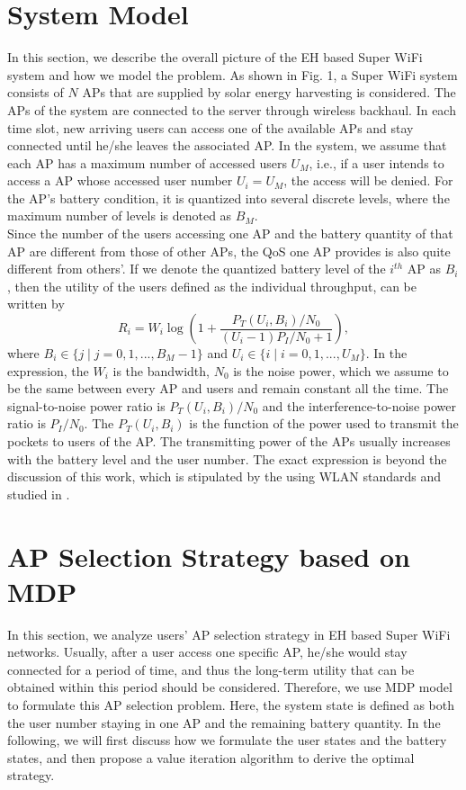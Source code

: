 \documentclass[conference]{IEEEtran}
\begin{document}
\section{System Model}
In this section, we describe the overall picture of the EH based Super WiFi system and how we model the problem. As shown in Fig. 1, a Super WiFi system consists of \(N\) APs that are supplied by solar energy harvesting is considered. The APs of the system are connected to the server through wireless backhaul. In each time slot, new arriving users can access one of the available APs and stay connected until he/she leaves the associated AP. In the system, we assume that each AP has a maximum number of accessed users \(U_M\), i.e., if a user intends to access a AP whose accessed user number \(U_i = U_{M}\), the access will be denied. For the AP's battery condition, it is quantized into several discrete levels, where the maximum number of levels is denoted as \(B_M\).\\
\indent Since the number of the users accessing one AP and the battery quantity of that AP are different from those of other APs, the QoS one AP provides is also quite different from others'. If we denote the quantized battery level of the \(i^{th}\) AP as \(B_i\), then the utility of the users defined as the individual throughput, can be written by
\begin{equation}
R_i = W_i \log\left(1 + \frac {P_T(U_i, B_i) / N_0} {(U_i-1)P_I/N_0+1}\right) ,
\end{equation}
where \(B_{i} \in \{ j \mid j = 0,1,...,B_M - 1\}\) and \(U_{i} \in \{ i \mid i = 0,1,...,U_M\}\). In the expression, the $W_i$ is the bandwidth, \(N_0\) is the noise power, which we assume to be the same between every AP and users and remain constant all the time. The signal-to-noise power ratio is \({P_T(U_i, B_i)}/ {N_0}\) and the interference-to-noise power ratio is \({P_I} / {N_0}\). The \(P_T(U_i, B_i)\) is the function of the power used to transmit the pockets to users of the AP. The transmitting power of the APs usually increases with the battery level and the user number. The exact expression is beyond the discussion of this work, which is stipulated by the using WLAN standards \cite{29} and studied in \cite{25}.\\

\section{AP Selection Strategy based on MDP}
\indent In this section, we analyze users' AP selection strategy in EH based Super WiFi networks. Usually, after a user access one specific AP, he/she would stay connected for a period of time, and thus the long-term utility that can be obtained within this period should be considered. Therefore, we use MDP model to formulate this AP selection problem. Here, the system state is defined as both the user number staying in one AP and the remaining battery quantity. In the following, we will first discuss how we formulate the user states and the battery states, and then propose a value iteration algorithm to derive the optimal strategy.
\end{document}
